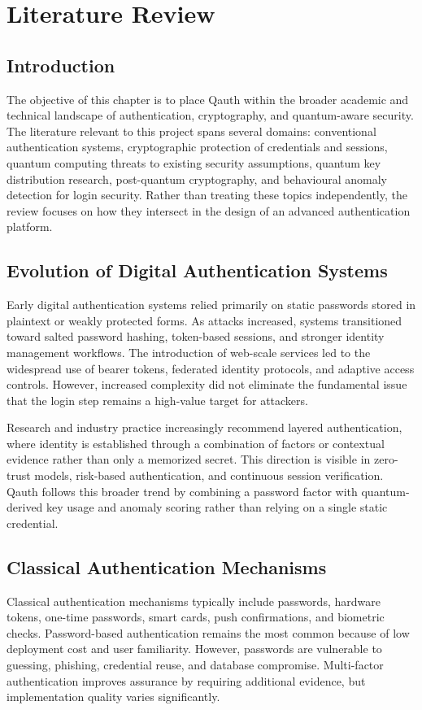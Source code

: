 \chapter{Literature Review}

\section{Introduction}
The objective of this chapter is to place Qauth within the broader academic and technical landscape of authentication, cryptography, and quantum-aware security. The literature relevant to this project spans several domains: conventional authentication systems, cryptographic protection of credentials and sessions, quantum computing threats to existing security assumptions, quantum key distribution research, post-quantum cryptography, and behavioural anomaly detection for login security. Rather than treating these topics independently, the review focuses on how they intersect in the design of an advanced authentication platform.

\section{Evolution of Digital Authentication Systems}
Early digital authentication systems relied primarily on static passwords stored in plaintext or weakly protected forms. As attacks increased, systems transitioned toward salted password hashing, token-based sessions, and stronger identity management workflows. The introduction of web-scale services led to the widespread use of bearer tokens, federated identity protocols, and adaptive access controls. However, increased complexity did not eliminate the fundamental issue that the login step remains a high-value target for attackers.

Research and industry practice increasingly recommend layered authentication, where identity is established through a combination of factors or contextual evidence rather than only a memorized secret. This direction is visible in zero-trust models, risk-based authentication, and continuous session verification. Qauth follows this broader trend by combining a password factor with quantum-derived key usage and anomaly scoring rather than relying on a single static credential.

\section{Classical Authentication Mechanisms}
Classical authentication mechanisms typically include passwords, hardware tokens, one-time passwords, smart cards, push confirmations, and biometric checks. Password-based authentication remains the most common because of low deployment cost and user familiarity. However, passwords are vulnerable to guessing, phishing, credential reuse, and database compromise. Multi-factor authentication improves assurance by requiring additional evidence, but implementation quality varies significantly.

